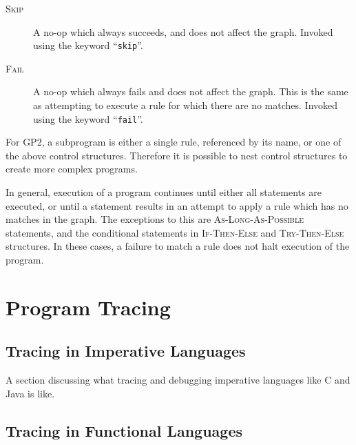 \documentclass[authoryearcitations]{UoYCSproject}
\begin{document}
\begin{description}
    \item[\textsc{Skip}]
    A no-op which always succeeds, and does not affect the graph. Invoked using the
    keyword ``\texttt{skip}''.

    \item[\textsc{Fail}]
    A no-op which always fails and does not affect the graph. This is the same as
    attempting to execute a rule for which there are no matches. Invoked using
    the keyword ``\texttt{fail}''.
\end{description}

For GP2, a subprogram is either a single rule, referenced by its name, or one of
the above control structures. Therefore it is possible to nest control structures
to create more complex programs.

In general, execution of a program continues until either all statements are
executed, or until a statement results in an attempt to apply a rule which has
no matches in the graph. The exceptions to this are \textsc{As-Long-As-Possible}
statements, and the conditional statements in \textsc{If-Then-Else} and
\textsc{Try-Then-Else} structures. In these cases, a failure to match a rule
does not halt execution of the program.


\section{Program Tracing}
\label{sec:ProgramTracing}


\subsection{Tracing in Imperative Languages}
\label{sec:TracingInImperativeLanguages}

A section discussing what tracing and debugging imperative languages like C and
Java is like.


\subsection{Tracing in Functional Languages}
\label{sec:TracingInFunctionalLanguages}
\end{document}

